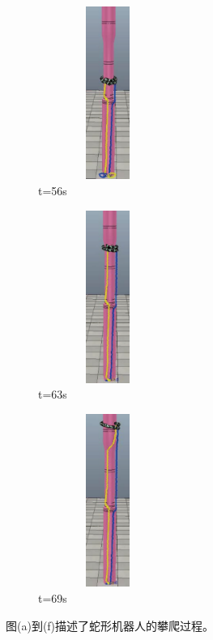 \begin{figure}[htbp]
\begin{subfigure}{0.3\textwidth}{
			\centering
			\includegraphics[height=160pt,width=0.5\textwidth]{figure/chap05/BSB/1m17s.eps}
			\caption{t=56s}
		}
	\end{subfigure}
	\begin{subfigure}{0.3\textwidth}{
			\centering
			\includegraphics[height=160pt,width=0.5\textwidth]{figure/chap05/BSB/1m27s.eps}
			\caption{t=63s}
		}
	\end{subfigure}
	\begin{subfigure}{0.3\textwidth}{
			\centering
			\includegraphics[height=160pt,width=0.5\textwidth]{figure/chap05/BSB/1m35s.eps}
			\caption{t=69s}
		}
	\end{subfigure}

	\caption{图(a)到(f)描述了蛇形机器人的攀爬过程。}
	\label{fig:BSB}
\end{figure}


